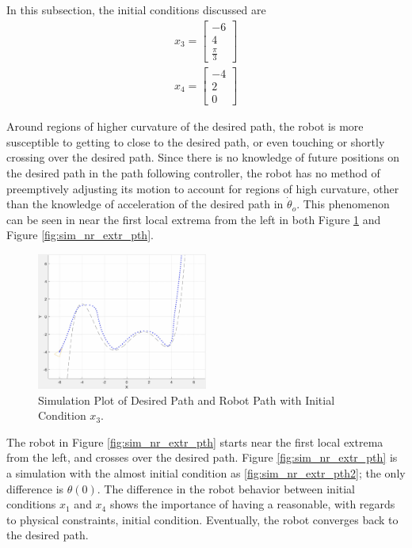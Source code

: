\documentclass[11pt, letterpaper]{article}
\numberwithin{equation}{section}
\begin{document}
In this subsection, the initial conditions discussed are
\begin{gather}
    x_3 = \begin{bmatrix} -6 \\ 4 \\ \frac{\pi}{3} \end{bmatrix} \\
    x_4 = \begin{bmatrix} -4 \\ 2 \\ 0 \end{bmatrix}
\end{gather}

Around regions of higher curvature of the desired path, the robot is more susceptible to getting to close to the desired path, or even touching or shortly crossing over the desired path. Since there is no knowledge of future positions on the desired path in the path following controller, the robot has no method of preemptively adjusting its motion to account for regions of high curvature, other than the knowledge of acceleration of the desired path in $\dot{\theta}_o$. This phenomenon can be seen in near the first local extrema from the left in both Figure \ref{fig:sim_btm_lft_crn} and Figure \ref{fig:sim_nr_extr_pth}.

\begin{figure}[H]
	\begin{center}
		\includegraphics[height=0.3\textheight, width=0.5\textwidth]{images/sim_btm_lft_crn.png}
		\caption{Simulation Plot of Desired Path and Robot Path with Initial Condition $x_3$.}
		\label{fig:sim_btm_lft_crn}
	\end{center}
\end{figure}

The robot in Figure \ref{fig:sim_nr_extr_pth} starts near the first local extrema from the left, and crosses over the desired path. Figure \ref{fig:sim_nr_extr_pth} is a simulation with the almost initial condition as \ref{fig:sim_nr_extr_pth2}; the only difference is $\theta(0)$. The difference in the robot behavior between initial conditions $x_1$ and $x_4$ shows the importance of having a reasonable, with regards to physical constraints, initial condition. Eventually, the robot converges back to the desired path.
\end{document}
